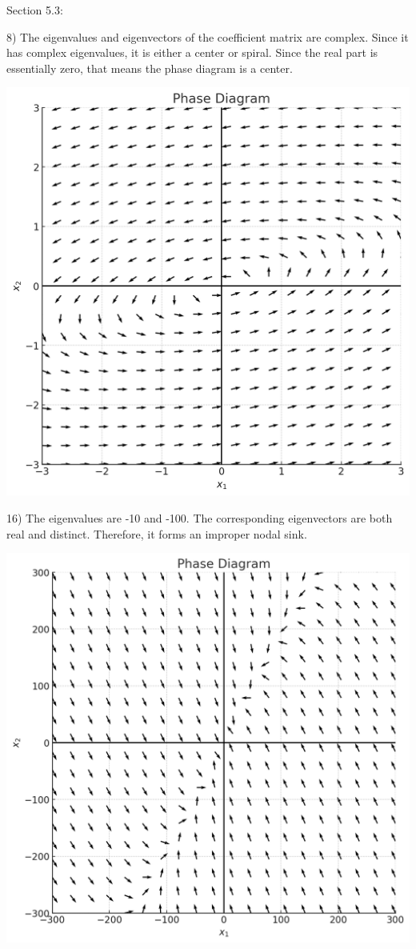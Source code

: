\documentclass{article}
\begin{document}
Section 5.3:

8) The eigenvalues and eigenvectors of the coefficient matrix are complex.
Since it has complex eigenvalues, it is either a center or spiral.
Since the real part is essentially zero, that means the phase diagram is a center.

\includegraphics[width=\linewidth]{5_3_8_phase_diagram}


16) The eigenvalues are -10 and -100. The corresponding eigenvectors
are both real and distinct. Therefore, it forms an improper nodal sink.

\includegraphics[width=\linewidth]{5_3_16_phase_diagram}
\end{document}
